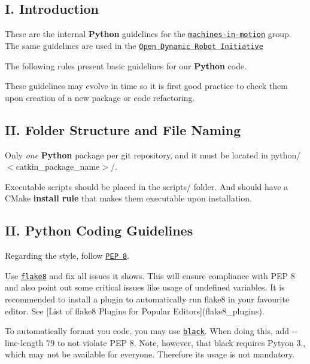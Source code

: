 \subsection*{I. Introduction}

These are the internal {\bfseries Python} guidelines for the \href{https://wp.nyu.edu/machinesinmotion/}{\tt machines-\/in-\/motion} group. The same guidelines are used in the \href{https://open-dynamic-robot-initiative.github.io/}{\tt Open Dynamic Robot Initiative}

The following rules present basic guidelines for our {\bfseries Python} code.

These guidelines may evolve in time so it is first good practice to check them upon creation of a new package or code refactoring.

\subsection*{II. Folder Structure and File Naming}


\begin{DoxyItemize}
\item Only {\itshape one} {\bfseries Python} package per git repository, and it must be located in {\ttfamily python/$<$catkin\+\_\+package\+\_\+name$>$/}.
\item Executable scripts should be placed in the {\ttfamily scripts/} folder. And should have a C\+Make {\bfseries install rule} that makes them executable upon installation.
\end{DoxyItemize}

\subsection*{II. Python Coding Guidelines}


\begin{DoxyItemize}
\item Regarding the style, follow \href{https://www.python.org/dev/peps/pep-0008/}{\tt P\+EP 8}.
\item Use \href{https://flake8.pycqa.org}{\tt flake8} and fix all issues it shows. This will ensure compliance with P\+EP 8 and also point out some critical issues like usage of undefined variables. It is recommended to install a plugin to automatically run flake8 in your favourite editor. See \mbox{[}List of flake8 Plugins for Popular Editors\mbox{]}(flake8\+\_\+plugins).
\item To automatically format you code, you may use \href{https://black.readthedocs.io}{\tt black}. When doing this, add {\ttfamily -\/-\/line-\/length 79} to not violate P\+EP 8. Note, however, that black requires Pytyon 3., which may not be available for everyone. Therefore its usage is not mandatory.
\end{DoxyItemize}


